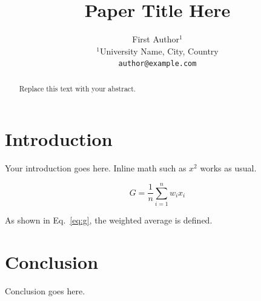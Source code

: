 \documentclass{article}
\title{Paper Title Here}
\author{First Author$^{1}$\\
$^{1}$University Name, City, Country\\
\texttt{author@example.com}\\
}
\begin{document}
\maketitle

\begin{abstract}
Replace this text with your abstract.
\end{abstract}

\section{Introduction}
Your introduction goes here. Inline math such as $x^2$ works as usual.

\begin{equation}
G = \frac{1}{n}\sum_{i=1}^{n} w_i x_i
\label{eq:g}
\end{equation}

As shown in Eq.~\ref{eq:g}, the weighted average is defined.

\section{Conclusion}
Conclusion goes here.



\end{document}
